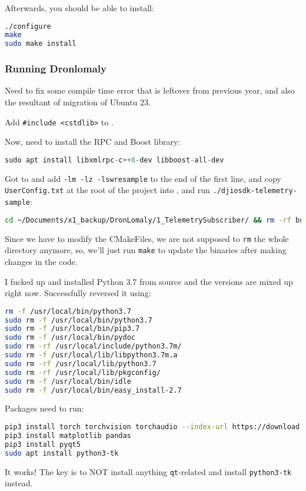 Afterwards, you should be able to install:
\begin{lstlisting}[language=bash]
./configure
make
sudo make install
\end{lstlisting}

\subsubsection{Running Dronlomaly}

Need to fix some compile time error that is leftover from previous year, and also the resultant of migration of Ubuntu 23.

Add \texttt{\#include <cstdlib>} to .

Now, need to install the RPC and Boost library:
\begin{lstlisting}[language=C++]
sudo apt install libxmlrpc-c++8-dev libboost-all-dev
\end{lstlisting}

Got to  and add \texttt{-lm -lz -lswresample} to the end of the first line, and copy \texttt{UserConfig.txt} at the root of the project into , and run \texttt{./djiosdk-telemetry-sample}:
\begin{lstlisting}[language=bash]
cd ~/Documents/x1_backup/DronLomaly/1_TelemetrySubscriber/ && rm -rf build && mkdir build && cd build && cmake .. && make && cp ../../UserConfig.txt bin
\end{lstlisting}
Since we have to modify the CMakeFiles, we are not supposed to \texttt{rm} the whole directory anymore, so, we'll just run \texttt{make} to update the binaries after making changes in the code.

I fucked up and installed Python 3.7 from source and the versions are mixed up right now. Successfully reversed it using:
\begin{lstlisting}[language=bash]
rm -f /usr/local/bin/python3.7
sudo rm -f /usr/local/bin/python3.7
sudo rm -f /usr/local/bin/pip3.7
sudo rm -f /usr/local/bin/pydoc
sudo rm -rf /usr/local/include/python3.7m/
sudo rm -f /usr/local/lib/libpython3.7m.a 
sudo rm -rf /usr/local/lib/python3.7
sudo rm -rf /usr/local/lib/pkgconfig/
sudo rm -f /usr/local/bin/idle
sudo rm -f /usr/local/bin/easy_install-2.7
\end{lstlisting}

Packages need to run:
\begin{lstlisting}[language=bash]
pip3 install torch torchvision torchaudio --index-url https://download.pytorch.org/whl/cpu
pip3 install matplotlib pandas
pip3 install pyqt5
sudo apt install python3-tk
\end{lstlisting}
It works! The key is to NOT install anything \texttt{qt}-related and install \texttt{python3-tk} instead.
